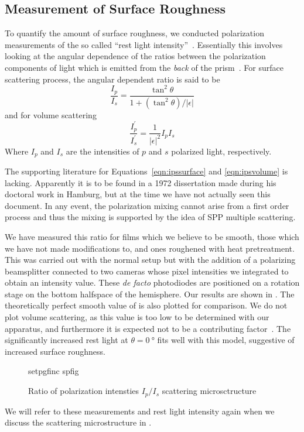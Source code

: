 \subsection{Measurement of Surface Roughness}
To quantify the amount of surface roughness, we conducted polarization
measurements of the so called ``rest light
intensity''~\cite{horstmann1977multiple}.  Essentially this involves
looking at the angular dependence of the ratios between the polarization
components of light which is emitted from the \textit{back} of the
prism~\cite{kretschmann1972decay}.
For surface scattering process, the angular dependent ratio is said to be
\begin{equation}
\frac{I_p}{I_s} = \frac{\tan^2\theta}{1+(\tan^2\theta)/|\epsilon|}
\label{eqn:ipssurface}
\end{equation}
and for volume scattering
\begin{equation}
\frac{I^\prime_p}{I^\prime_s} = \frac{1}{|\epsilon|^2} I_p I_s
\label{eqn:ipsvolume}
\end{equation}
Where $I_p$ and $I_s$ are the intensities of $p$ and $s$ polarized light,
respectively.

The supporting literature for Equations~\ref{eqn:ipssurface} and
\ref{eqn:ipsvolume} is lacking.  Apparently it is to be found in a 1972
dissertation  made during his doctoral work in Hamburg, but
at the time we have not actually seen this document.  In any event, the
polarization mixing cannot arise from a first order process and thus
the mixing is supported by the idea of SPP multiple scattering.

We have measured this ratio for films which we believe to be smooth, those
which we have not made modifications to, and ones roughened with heat
pretreatment.  This was carried out with the normal setup but with the
addition of a polarizing beamsplitter connected to two cameras whose pixel
intensities we integrated to obtain an intensity value.  These \textit{de
facto} photodiodes are positioned on a rotation stage on the bottom
halfspace of the hemisphere.  Our results are shown in .
The theoretically perfect smooth value of  is also
plotted for comparison.  We do not plot volume scattering, as this value is
too low to be determined with our apparatus, and furthermore it is expected
not to be a contributing factor~\cite{kretschmann1972decay}.  The
significantly increased rest light at $\theta=\SI{0}{\degree}$ fits well
with this model, suggestive of increased surface roughness.
\begin{figure}[ht]
 \centering
 {setpgfinc}
 {spfig}
 \caption{Ratio of polarization intensties $I_p/I_s$ scattering microsctructure}
 \label{fig:spratio}
\end{figure}

We will refer to these measurements and rest light intensity again when we
discuss the scattering microstructure in .
